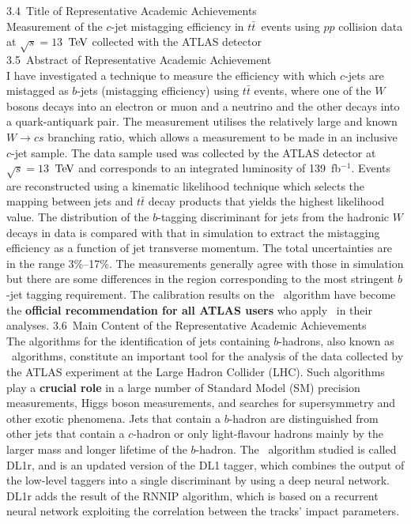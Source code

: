 \documentclass[twoside,11pt]{report}
\begin{document}
\Large{3.4\ Title of Representative Academic Achievements}\\
\newline
\normalsize
Measurement of the $c$-jet mistagging efficiency in $t\bar{t}$~events 
using $pp$ collision data at $\sqrt{s}=13$~$\text{Te\kern -0.1em V}$ collected with the ATLAS detector\\
\newline
\Large{3.5\ Abstract of Representative Academic Achievement}\\
\normalsize
\newline
    I have investigated a technique to measure the  efficiency 
    with which $c$-jets are mistagged as $b$-jets (mistagging efficiency) 
    using $t\bar{t}$ events, where one of the $W$
    bosons decays into an electron or muon and a neutrino and the other
    decays into a quark-antiquark pair. The measurement utilises the relatively large
    and known $W\to cs$ branching ratio, which allows a measurement to be made
    in an inclusive $c$-jet sample.  The data sample used was
    collected by the ATLAS detector at $\sqrt{s} = 13$~$\text{Te\kern -0.1em V}$ 
    and corresponds to an integrated luminosity of 139~fb$^{-1}$.  
    Events are reconstructed using a kinematic likelihood technique
    which selects the mapping between jets and $t\bar{t}$
    decay products that yields the highest likelihood value.
    The distribution of the $b$-tagging discriminant for jets from the hadronic $W$ 
    decays in data is compared with that in simulation to extract the mistagging efficiency 
    as a function of jet transverse momentum. 
    The total uncertainties are in the range 3\%--17\%. 
    The measurements generally agree with 
    those in simulation but there are some differences 
    in the region corresponding to the most stringent $b$-jet tagging requirement.
    The calibration results on the \btagging\ algorithm have become the 
    \textbf{official recommendation for
    all ATLAS users} who apply \btagging\ in their analyses. 
    \newline
\Large{3.6\ Main Content of the Representative Academic Achievements}\\
\normalsize
\newline
    The algorithms for the identification of jets containing $b$-hadrons,
    also known as \btagging\ algorithms,  
    constitute an important tool for the analysis of the data collected by the ATLAS 
    experiment at the Large Hadron Collider (LHC).
    Such algorithms play a \textbf{crucial role} in a large number of Standard Model (SM) 
    precision measurements, Higgs boson measurements, and searches for supersymmetry
    and other exotic phenomena. 
    Jets that contain a $b$-hadron are distinguished from other jets that
    contain a $c$-hadron or only light-flavour hadrons mainly by the
    larger mass and longer lifetime of the $b$-hadron.  The \btagging\ 
    algorithm studied is called DL1r, and is an updated
    version of the DL1 tagger, which combines the output of the 
    low-level taggers into a single discriminant by using a deep neural network.
    DL1r adds the result of the RNNIP algorithm, which is
    based on a recurrent neural network exploiting the correlation between
    the tracks' impact parameters. 
\end{document}
